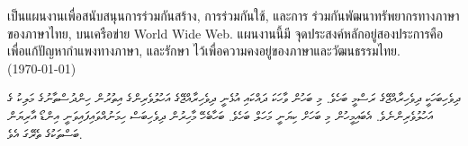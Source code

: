 \documentclass[a4paper]{article}
\begin{document}
\begin{thai}
เป็น\wbr แผนงานเพื่อ\wbr สนับสนุน\wbr การ\wbr ร่วมกัน\wbr สร้าง, การ\wbr ร่วมกันใช้, และ\wbr การ%
ร่วมกัน\wbr พัฒนา\wbr ทรัพยากร\wbr ทาง\wbr ภาษา\wbr ของ\wbr ภาษา\wbr ไทย, บน\wbr เครือข่าย World Wide Web. แผนงานนี้\wbr มี%
จุด\wbr ประสงค์หลั\wbr กอยู่\wbr สอง\wbr ประการคือ เพื่อแก้ปัญหา\wbr กำ\wbr แพง\wbr ทาง\wbr ภาษา, และรักษา%
ไว้เพื่อ\wbr ความค\wbr งอยู่\wbr ของ\wbr ภาษา\wbr และ\wbr วัฒนธรรม\wbr ไทย. \\
(\today)
\end{thai}

\begin{divehi}\small\sloppy
ދިވެހިބަހަކީ ދިވެހިރާއްޖޭގެ ރަސްމީ ބަހެވެ. މި ބަހުން ވާހަކަ ދައްކައި އުޅެނީ ދިވެހިރާއްޖޭގެ އަހުލުވެރިންގެ އިތުރުން ހިންދުސްތާނުގެ މަލިކު ގެ
އަހުލުވެރިންނެވެ. އެބައިމީހުން މި ބަހަށް ކިޔަނީ މަހަލް ބަހެވެ. ބަހާބެހޭ މާހިރުން ދިވެހިބަސް ހިމަނުއްވައިފައިވަނީ އިންޑޯ އާރިޔަން ބަސްތަކުގެ
ތެރޭގަ އެވެ. 
\end{divehi}

%
\end{document}
